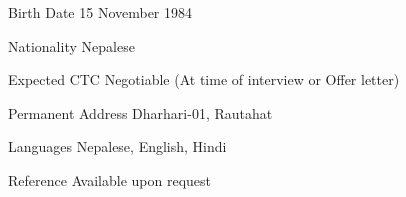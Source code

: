 

\begin{cvskills}
	\cvskill
	{Birth Date} %
	{15 November 1984} %
	
	\cvskill
	{Nationality} %
	{Nepalese} %
	
	\cvskill
	{Expected CTC} %
	{Negotiable (At time of interview or Offer letter)} %
	
	\cvskill
	{Permanent Address} %
	{Dharhari-01, Rautahat} %
	
	\cvskill
	{Languages} %
	{Nepalese, English, Hindi} %
	
	
	\cvskill
	{Reference} %
	{Available upon request} %
		
\end{cvskills}

